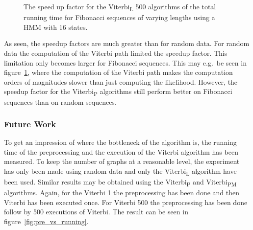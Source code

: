 \begin{figure}
  \centering
  
  \caption{The speed up factor for the Viterbi\textsubscript{L} 500 algorithms of the total
    running time for Fibonacci sequences of varying
    lengths using a HMM with 16 states.}
  \label{fig:fib_compressed_500_speedup_vs_sequence_length}
\end{figure}

As seen, the speedup factors are much greater than for random data. For random
data the computation of the Viterbi path limited the speedup factor. This
limitation only becomes larger for Fibonacci sequences. This may e.g.\ be seen
in figure~\ref{fig:fib_compressed_500_speedup_vs_sequence_length}, where the
computation of the Viterbi path makes the computation orders of magnitudes
slower than just computing the likelihood. However, the speedup factor for the
Viterbi\textsubscript{P} algorithms still perform better on Fibonacci sequences than on
random sequences.

\subsubsection{Future Work}

To get an impression of where the bottleneck of the algorithm is, the running
time of the preprocessing and the execution of the Viterbi algorithm has been
measured. To keep the number of graphs at a reasonable level, the experiment
has only been made using random data and only the Viterbi\textsubscript{L}
algorithm have been used. Similar results may be obtained using the
Viterbi\textsubscript{P} and Viterbi\textsubscript{PM} algorithms. Again, for
the Viterbi 1 the preprocessing has been done and then Viterbi has been
executed once. For Viterbi 500 the preprocessing has been done follow by 500
executions of Viterbi. The result can be seen in
figure~\ref{fig:pre_vs_running}.


